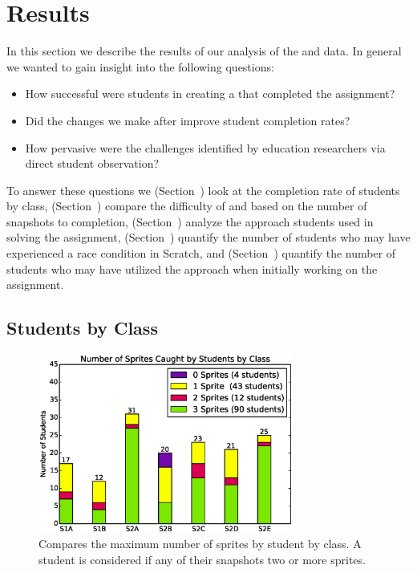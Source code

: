 \section{Results}
In this section we describe the results of our analysis of the \sone{} and
\stwo{} data. In general we wanted to gain insight into the following
questions:

\begin{itemize}
\item How successful were students in creating a \sprogram{} that completed the
  assignment?
\item Did the changes we make after \sone{} improve student completion rates?
\item How pervasive were the challenges identified by education researchers via
  direct student observation?
\end{itemize}

To answer these questions we (Section~) look at the
completion rate of students by class, (Section~)
compare the difficulty of \sone{} and \stwo{} based on the number of snapshots
to completion, (Section~) analyze the approach students
used in solving the assignment, (Section~) quantify the
number of students who may have experienced a race condition in Scratch, and
(Section~) quantify the number of students who may have
utilized the \dce{} approach when initially working on the assignment.


\subsection{Students by Class}

\begin{figure}[!t]
\centering
\includegraphics[width=3.3in]{graphs/by_class_students.eps}
\caption{Compares the maximum number of sprites \caught{} by student by
  class. A student is considered \com{} if any of their snapshots 
  two or more sprites.}
\end{figure}

